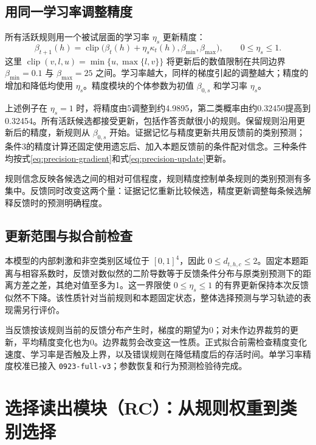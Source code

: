\documentclass[12pt]{article}
\newcommand{\clip}{\operatorname{clip}}
\begin{document}
\subsection{用同一学习率调整精度}

所有活跃规则用一个被试层面的学习率 $\eta_s$ 更新精度：
\begin{equation}
\beta_{t+1}(h)=
\clip\bigl(\beta_t(h)+\eta_s\kappa_t(h),\beta_{\min},\beta_{\max}\bigr),
\qquad 0\leq\eta_s\leq1.
\label{eq:precision-update}
\end{equation}
这里 $\clip(v,l,u)=\min\{u,\max\{l,v\}\}$ 将更新后的数值限制在共同边界 $\beta_{\min}=0.1$ 与 $\beta_{\max}=25$ 之间。学习率越大，同样的梯度引起的调整越大；精度的增加和降低均使用 $\eta_s$。精度模块的个体参数为初值 $\beta_{0,s}$ 和学习率 $\eta_s$。

上述例子在 $\eta_s=1$ 时，将精度由5调整到约4.9895，第二类概率由约0.32450提高到0.32454。所有活跃候选都接受更新，包括作答贡献很小的规则。保留规则沿用更新后的精度，新规则从 $\beta_{0,s}$ 开始。证据记忆与精度更新共用反馈前的类别预测；条件3的精度计算还固定使用遗忘后、加入本题反馈前的条件配对信念。三种条件均按式\eqref{eq:precision-gradient}和式\eqref{eq:precision-update}更新。

规则信念反映各候选之间的相对可信程度，规则精度控制单条规则的类别预测有多集中。反馈同时改变这两个量：证据记忆重新比较候选，精度更新调整每条候选解释反馈时的预测明确程度。

\subsection{更新范围与拟合前检查}

本模型的内部刺激和非空类别区域位于 $[0,1]^4$，因此 $0\leq d_{t,h,c}\leq2$。固定本题距离与相容系数时，反馈对数似然的二阶导数等于反馈条件分布与原类别预测下的距离方差之差，其绝对值至多为1。这一界限使 $0\leq\eta_s\leq1$ 的有界更新保持本次反馈似然不下降。该性质针对当前规则和本题固定状态，整体选择预测与学习轨迹的表现需另行评价。

当反馈按该规则当前的反馈分布产生时，梯度的期望为0；对未作边界裁剪的更新，平均精度变化也为0。边界裁剪会改变这一性质。正式拟合前需检查精度变化速度、学习率是否触及上界，以及错误规则在降低精度后的存活时间。单学习率精度校准已接入 \texttt{0923-full-v3}；参数恢复和行为预测检验待完成。

\section{选择读出模块（RC）：从规则权重到类别选择}
\label{sec:execution}
\end{document}
